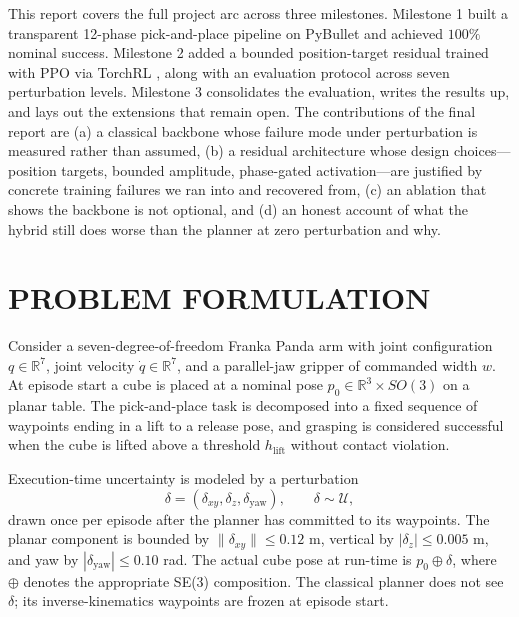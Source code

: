 \documentclass[letterpaper, 11 pt, journal, twoside]{IEEEtran}
\newcommand{\R}{\mathbb{R}}
\def\scr#1{{\mathcal #1}}
\begin{document}
This report covers the full project arc across three milestones. Milestone 1 built a transparent 12-phase pick-and-place pipeline on PyBullet \cite{Coumans2016PyBullet} and achieved $100\%$ nominal success. Milestone 2 added a bounded position-target residual trained with PPO \cite{Schulman2017PPO} via TorchRL \cite{Bou2023TorchRL}, along with an evaluation protocol across seven perturbation levels. Milestone 3 consolidates the evaluation, writes the results up, and lays out the extensions that remain open. The contributions of the final report are (a) a classical backbone whose failure mode under perturbation is measured rather than assumed, (b) a residual architecture whose design choices---position targets, bounded amplitude, phase-gated activation---are justified by concrete training failures we ran into and recovered from, (c) an ablation that shows the backbone is not optional, and (d) an honest account of what the hybrid still does worse than the planner at zero perturbation and why.

\section{PROBLEM FORMULATION}
\label{sec:problem}

Consider a seven-degree-of-freedom Franka Panda arm \cite{Haddadin2022Franka} with joint configuration $q \in \R^7$, joint velocity $\dot q \in \R^7$, and a parallel-jaw gripper of commanded width $w$. At episode start a cube is placed at a nominal pose $p_0 \in \R^3 \times SO(3)$ on a planar table. The pick-and-place task is decomposed into a fixed sequence of waypoints ending in a lift to a release pose, and grasping is considered successful when the cube is lifted above a threshold $h_{\mathrm{lift}}$ without contact violation.

Execution-time uncertainty is modeled by a perturbation
\begin{equation}
\delta = (\delta_{xy}, \delta_z, \delta_\text{yaw}), \qquad \delta \sim \scr{U},
\label{eq:perturb}
\end{equation}
drawn once per episode after the planner has committed to its waypoints. The planar component is bounded by $\|\delta_{xy}\| \le 0.12$ m, vertical by $|\delta_z| \le 0.005$ m, and yaw by $|\delta_\text{yaw}| \le 0.10$ rad. The actual cube pose at run-time is $p_0 \oplus \delta$, where $\oplus$ denotes the appropriate SE(3) composition. The classical planner does not see $\delta$; its inverse-kinematics waypoints are frozen at episode start.
\end{document}
